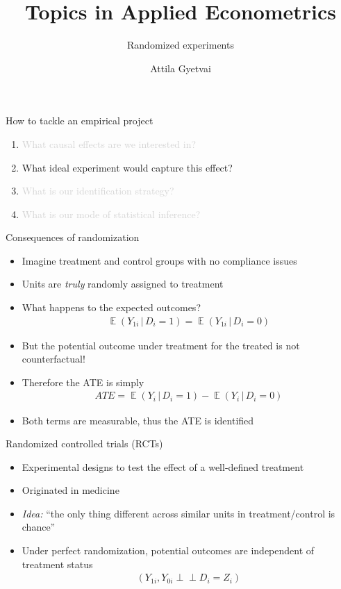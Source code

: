 \documentclass[aspectratio=169,compress,handout,t,xcolor=table]{beamer}
\title{Topics in Applied Econometrics}
\subtitle[]{Randomized experiments}
\author[Attila Gyetvai]{Attila Gyetvai}
\institute[]{Duke Economics \\ Summer 2020}
\date{}
\DeclareMathOperator{\E}{\mathbb{E}}                       %
\providecommand{\indep}{\perp \!\!\!\! \perp}              %
\begin{document}
{
\begin{frame}
  \titlepage
\end{frame}
}
\addtocounter{framenumber}{-1}

\begin{frame}[c]{How to tackle an empirical project}
  \begin{enumerate}
    \addtolength{\itemsep}{0.5\baselineskip}
    \item \textcolor{lightgray}{What causal effects are we interested in?}
    \item What ideal experiment would capture this effect?
    \item \textcolor{lightgray}{What is our identification strategy?}
    \item \textcolor{lightgray}{What is our mode of statistical inference?}
  \end{enumerate}
\end{frame}

\begin{frame}{Consequences of randomization}
  \begin{itemize}
    \item Imagine treatment and control groups with no compliance issues 
    \item Units are \emph{truly} randomly assigned to treatment
    \item What happens to the expected outcomes?
    \begin{align*}
      \E(Y_{1i} \,|\, D_i=1) = \E(Y_{1i} \,|\, D_i=0)
    \end{align*}
    \item But the potential outcome under treatment for the treated is not counterfactual!
    \item Therefore the ATE is simply
    \begin{align*}
      ATE = \E(Y_i \,|\, D_i=1) - \E(Y_i \,|\, D_i=0)
    \end{align*}
    \item Both terms are measurable, thus the ATE is identified
  \end{itemize}
\end{frame}

\begin{frame}{Randomized controlled trials (RCTs)}
  \begin{itemize}
    \item Experimental designs to test the effect of a well-defined treatment
    \item Originated in medicine
    \item \emph{Idea:} ``the only thing different across similar units in treatment/control is chance''
    \item Under perfect randomization, potential outcomes are independent of treatment status
    \begin{align*}
      (Y_{1i}, Y_{0i} \indep D_i = Z_i)
    \end{align*}
  \end{itemize}
\end{frame}
\end{document}
